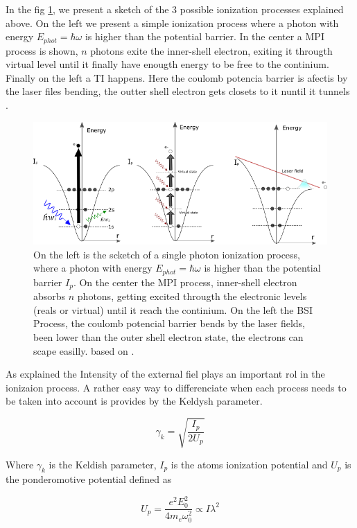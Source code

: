 In the fig \ref{img:ionizationprocess}, we present a sketch of the 3 possible ionization processes explained above. On the left we present a simple ionization process where a photon with energy $E_{phot} = \hbar\omega$ is higher than the potential barrier. In the center a MPI process is shown, $n$ photons exite the inner-shell electron, exiting it througth virtual level until it finally have enougth energy to be free to the continium. Finally on the left a TI happens. Here the coulomb potencia barrier is afectis by the laser files bending, the outter shell electron  gets closets to it nuntil it tunnels \cite{rafipoor_two-color_2017}.

\begin{figure}[hbtp]
\label{img:ionizationprocess}
\centering
\includegraphics[width = 8 cm]{../Images/photoionization2.png}
\caption[Ionization regimes]{ On the left is the scketch of a single photon ionization process, where a photon with energy $E_{phot} = \hbar\omega$ is higher than the potential barrier $I_{p}$. On the center the MPI process,  inner-shell electron absorbs $n$ photons, getting excited througth the electronic levels (reals or virtual)  until it reach the continium. On the left the BSI Process, the coulomb potencial barrier bends by the laser fields, been lower than the outer shell electron state, the electrons can scape easilly. based on \cite{rafipoor_two-color_2017}.}
\end{figure}


As explained the Intensity of the external fiel plays an important rol in the ionizaion process. A rather easy way to differenciate when each process needs to be taken into account is provides by the Keldysh parameter\cite{keldysh_ionization_1965}.

\begin{equation}
\gamma_{k}=\sqrt{\dfrac{I_{p}}{2U_{p}}}
\end{equation}

Where $\gamma_{k}$ is the Keldish parameter, $I_{p}$ is the atoms ionization potential and $U_{p}$ is the ponderomotive potential defined as

\begin{equation}
U_{p} = \dfrac{e^{2}E_{0}^{2}}{4m_{e}\omega_{0}^{2}} \propto I \lambda^{2}
\end{equation}

